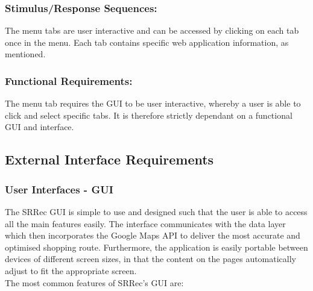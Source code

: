 \documentclass[10pt,twocolumn]{witseiepaper}
\begin{document}
		\subsubsection*{Stimulus/Response Sequences:}
		
		The menu tabs are user interactive and can be accessed by clicking on each tab once in the menu. Each tab contains specific web application information, as mentioned. 
		
		\subsubsection*{Functional Requirements:}
		
		The menu tab requires the GUI to be user interactive, whereby a user is able to click and select specific tabs. It is therefore strictly dependant on a functional GUI and interface.
		
		
		\subsection{External Interface Requirements}
		
		\subsubsection{User Interfaces - GUI}
		
		The SRRec GUI is simple to use and designed such that the user is able to access all the main features easily. The interface communicates with the data layer which then incorporates the Google Maps API to deliver the most accurate and optimised shopping route. Furthermore, the application is easily portable between devices of different screen sizes, in that the content on the pages automatically adjust to fit the appropriate screen.\\
		
		The most common features of SRRec's GUI are:
		
\end{document}

